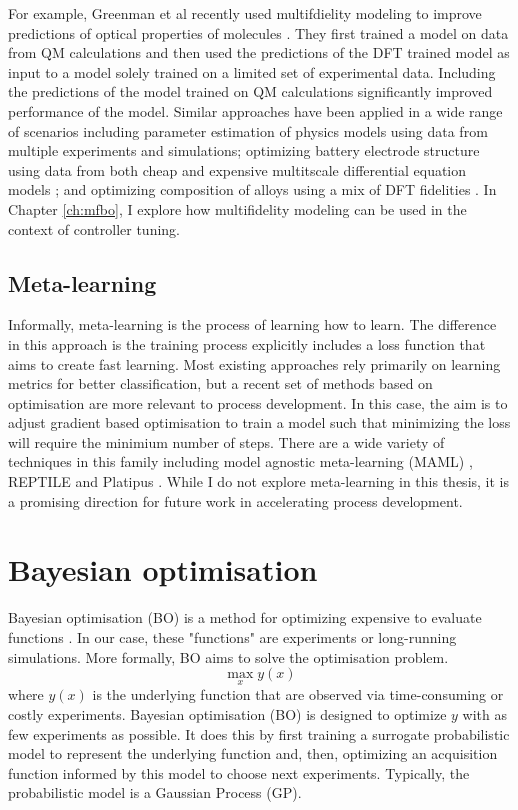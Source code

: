 For example, Greenman et al recently used multifdielity modeling to improve predictions of optical properties of molecules \cite{Greenman2022}. They first trained a model on data from QM calculations and then used the predictions of the DFT trained model as input to a model solely trained on a limited set of experimental data. Including the predictions of the model trained on QM calculations significantly improved performance of the model. Similar approaches have been applied in a wide range of scenarios including parameter estimation of physics models using data from multiple experiments and simulations;\cite{Perdikaris2016} optimizing battery electrode structure using data from both cheap and expensive multitscale differential equation models \cite{Pan2017}; and optimizing composition of alloys using a mix of DFT fidelities \cite{Tran2020}. In Chapter \ref{ch:mfbo}, I explore how multifidelity modeling can be used in the context of controller tuning.

\subsection{Meta-learning}

Informally, meta-learning is the process of learning how to learn. The difference in this approach is the training process explicitly includes a loss function that aims to create fast learning. Most existing approaches rely primarily on learning metrics for better classification, but a recent set of methods based on optimisation are more relevant to process development.  In this case, the aim is to adjust gradient based optimisation to train a model such that minimizing the loss will require the minimium number of steps. There are a wide variety of techniques in this family including model agnostic meta-learning (MAML) \cite{Finn2017}, REPTILE \cite{Nichols2018} and Platipus \cite{Finn2018}. While I do not explore meta-learning in this thesis, it is a promising direction for future work in accelerating process development.



\section{Bayesian optimisation}

Bayesian optimisation (BO) is a method for optimizing expensive to evaluate functions \cite{Shahriari2016}. In our case, these "functions" are experiments or long-running simulations. More formally, BO aims to solve the optimisation problem.
\begin{equation}
    \max_x y(x)
\end{equation}
where $y(x)$ is the underlying function that are observed via time-consuming or costly experiments. Bayesian optimisation (BO) is designed to optimize $y$ with as few experiments as possible. It does this by first training a surrogate probabilistic model to represent the underlying function and, then, optimizing an acquisition function informed by this model to choose next experiments. Typically, the probabilistic model is a Gaussian Process (GP). 

